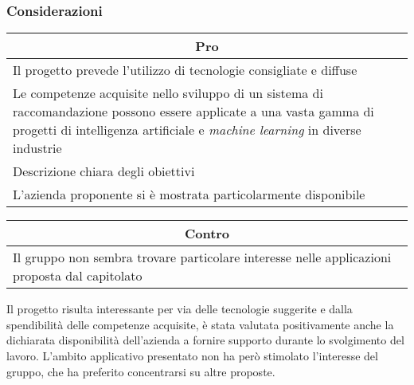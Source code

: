 \subsubsection{Considerazioni}
\begin{minipage}[t]{0.45\linewidth}
    \vspace{0pt}
    {\renewcommand{\arraystretch}{1.5}
    \begin{tabular}{p{1\linewidth}}
        \multicolumn{1}{c}{\textbf{Pro}} \\
        \midrule
        Il progetto prevede l'utilizzo di tecnologie consigliate e diffuse \\
        Le competenze acquisite nello sviluppo di un sistema di raccomandazione possono essere applicate a una vasta gamma di progetti di intelligenza artificiale e \textit{machine learning} in diverse industrie \\
        Descrizione chiara degli obiettivi \\
        L'azienda proponente si è mostrata particolarmente disponibile \\
        \hline
    \end{tabular}
    }
\end{minipage}
\hspace{0.05\linewidth}
\begin{minipage}[t]{0.45\linewidth}
    \vspace{0pt}
    {\renewcommand{\arraystretch}{1.5}
    \begin{tabular}{p{1\linewidth}}
        \multicolumn{1}{c}{\textbf{Contro}} \\
        \midrule
        Il gruppo non sembra trovare particolare interesse nelle applicazioni proposta dal capitolato \\
        \hline
    \end{tabular}
    }
\end{minipage}
\vspace{1em}

Il progetto risulta interessante per via delle tecnologie suggerite e dalla spendibilità delle competenze acquisite, è stata valutata positivamente anche la dichiarata disponibilità dell'azienda a fornire supporto durante lo svolgimento del lavoro.
L'ambito applicativo presentato non ha però stimolato l'interesse del gruppo, che ha preferito concentrarsi su altre proposte.